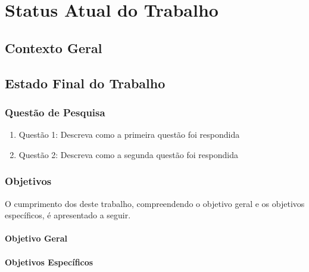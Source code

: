 \chapter{Status Atual do Trabalho}
\label{cap-status-atual}


\section{Contexto Geral}
\label{contexto-geral}

\section{Estado Final do Trabalho}
\label{status-final}

\subsection{Questão de Pesquisa}
\label{status-pesquisa}

\begin{enumerate}
\item Questão 1: Descreva como a primeira questão foi respondida
\item Questão 2: Descreva como a segunda questão foi respondida
\end{enumerate}

\subsection{Objetivos}
\label{status-objetivos}

O cumprimento dos  deste trabalho, compreendendo o objetivo geral e os objetivos específicos, é apresentado a seguir.

\subsubsection{Objetivo Geral}
\label{status-objetivo-geral}

\subsubsection{Objetivos Específicos}
\label{status-objetivo-especificos}

